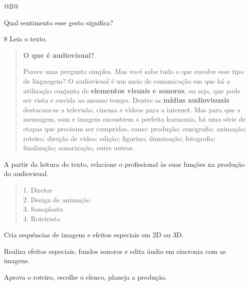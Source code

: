 \begin{itemize}
\begin{itemize}
\begin{escolha}[]{@{}ll@{}}

Qual sentimento esse gesto significa?


\num{8} Leia o texto.

\begin{quote}
\textbf{O que é audiovisual?}

Parece uma pergunta simples. Mas você sabe tudo o que envolve esse tipo
de linguagem? O audiovisual é um meio de comunicação em que há a
utilização conjunta de \textbf{elementos visuais e sonoros}, ou seja,
que pode ser vista e ouvida ao mesmo tempo. Dentre as \textbf{mídias
audiovisuais} destacam-se a
televisão, cinema e vídeos
para a internet. Mas para que a mensagem, som e imagem encontrem a
perfeita harmonia, há uma série de etapas que precisam ser cumpridas,
como: produção; cenografia;
animação; roteiro;
direção de vídeo; edição; figurino; iluminação; fotografia; finalização;
sonorização, entre outros.

\end{quote}

A partir da leitura do texto, relacione o profissional às suas funções
na produção do audiovisual.

\begin{quote}
1. Diretor\\
2. Design de animação\\
3.  Sonoplasta\\
4. Roteirista
\end{quote}

\begin{boxlist}
\item Cria sequências de imagens e efeitos especiais em 2D ou 3D. 

\item Realiza efeitos especiais, fundos sonoros e edita áudio em sincronia com as imagens. 

\item Aprova o roteiro, escolhe o elenco, planeja a produção. 


\end{boxlist}
\end{escolha}
\end{itemize}
\end{itemize}
